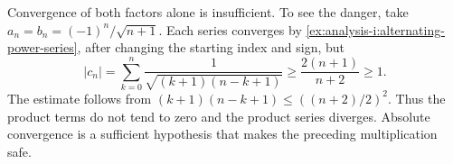 Convergence of both factors alone is insufficient. To see the danger,
take $a_n=b_n=(-1)^n/\sqrt{n+1}$. Each series converges by
\autoref{ex:analysis-i:alternating-power-series}, after changing the
starting index and sign, but
\[
  |c_n|=\sum_{k=0}^{n}\frac1{\sqrt{(k+1)(n-k+1)}}
    \ge\frac{2(n+1)}{n+2}\ge1.
\]
The estimate follows from
$(k+1)(n-k+1)\le((n+2)/2)^2$. Thus the product terms do not tend to
zero and the product series diverges. Absolute convergence is a
sufficient hypothesis that makes the preceding multiplication safe.
